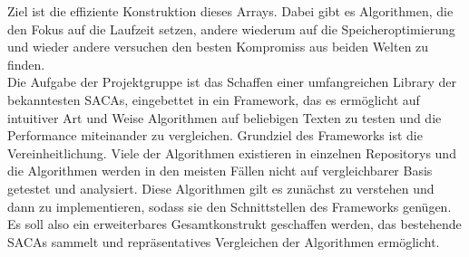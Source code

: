 \bigskip
\noindent Ziel ist die effiziente Konstruktion dieses Arrays. Dabei gibt es Algorithmen, die den Fokus auf die Laufzeit setzen, andere wiederum auf die Speicheroptimierung und wieder andere versuchen den besten Kompromiss aus beiden Welten zu finden.
\\Die Aufgabe der Projektgruppe ist das Schaffen einer umfangreichen Library der bekanntesten SACAs, eingebettet in ein Framework, das es ermöglicht auf intuitiver Art und Weise Algorithmen auf beliebigen Texten zu testen und die Performance miteinander zu vergleichen. Grundziel des Frameworks ist die Vereinheitlichung. Viele der Algorithmen existieren in einzelnen Repositorys und die Algorithmen werden in den meisten Fällen nicht auf vergleichbarer Basis getestet und analysiert. Diese Algorithmen gilt es zunächst zu verstehen und dann zu implementieren, sodass sie den Schnittstellen des Frameworks genügen. Es soll also ein erweiterbares Gesamtkonstrukt geschaffen werden, das bestehende SACAs sammelt und repräsentatives Vergleichen der Algorithmen ermöglicht.


